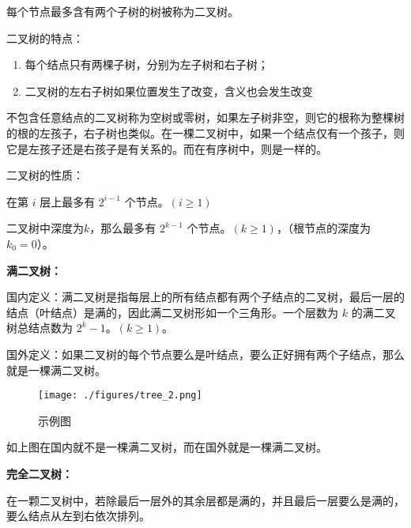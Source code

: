 
每个节点最多含有两个子树的树被称为二叉树。

二叉树的特点：

\begin{enumerate}
\item 每个结点只有两棵子树，分别为左子树和右子树；
\item 二叉树的左右子树如果位置发生了改变，含义也会发生改变
\end{enumerate}

不包含任意结点的二叉树称为空树或零树，如果左子树非空，则它的根称为整棵树的根的左孩子，右子树也类似。在一棵二叉树中，如果一个结点仅有一个孩子，则它是左孩子还是右孩子是有关系的。而在有序树中，则是一样的。

二叉树的性质：

在第 $i$ 层上最多有 $2 ^ {i - 1}$ 个节点。$(i\geq1)$

二叉树中深度为$k$，那么最多有 $2 ^ {k - 1}$ 个节点。$(k\geq1)$，（根节点的深度为 $k_0 = 0$）。

\textbf{满二叉树：}

国内定义：满二叉树是指每层上的所有结点都有两个子结点的二叉树，最后一层的结点（叶结点）是满的，因此满二叉树形如一个三角形。一个层数为 $k$ 的满二叉树总结点数为 $2^k - 1$。$(k\geq1)$。

国外定义：如果二叉树的每个节点要么是叶结点，要么正好拥有两个子结点，那么就是一棵满二叉树。

\begin{figure}[ht]
\centering
\texttt{[image: ./figures/tree\_2.png]}
\caption{示例图} \label{tree_fig2}
\end{figure}

如上图在国内就不是一棵满二叉树，而在国外就是一棵满二叉树。

\textbf{完全二叉树：}

在一颗二叉树中，若除最后一层外的其余层都是满的，并且最后一层要么是满的，要么结点从左到右依次排列。